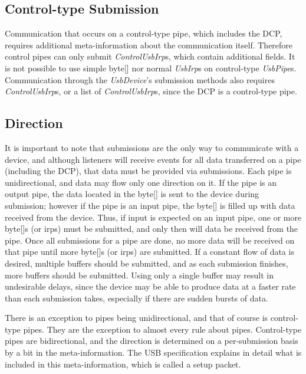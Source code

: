\documentclass{article}
\newcommand{\myinterface}[1]{\emph{#1}}
\begin{document}
\subsection{Control-type Submission}

Communication that occurs on a control-type pipe, which includes the
DCP, requires additional meta-information about the
communication itself.  Therefore control pipes can only submit
\myinterface{ControlUsbIrp}s, which contain additional fields.
It is not possible to use simple byte[] nor normal \myinterface{UsbIrp}s
on control-type \myinterface{UsbPipe}s.  Communication through
the \myinterface{UsbDevice}'s submission methods also requires
\myinterface{ControlUsbIrp}s, or a list of \myinterface{ControlUsbIrp}s,
since the DCP is a control-type pipe.

\subsection{Direction}

It is important to note that submissions are the only way to communicate
with a device, and although listeners will receive events for all data
transferred on a pipe (including the DCP), that data must be provided via
submissions.  Each pipe is unidirectional, and data may flow only one
direction on it.  If the pipe is an output pipe, the data located in the
byte[] is sent to the device during submission; however if the pipe
is an input pipe, the byte[] is filled up with data received from the device.
Thus, if input is expected on an input pipe, one or more byte[]s (or irps)
must be submitted, and only then will data be received from the pipe.
Once all submissions for a pipe are done, no more data will be received on
that pipe until more byte[]s (or irps) are submitted.  If a constant flow
of data is desired, multiple buffers should be submitted, and as each
submission finishes, more buffers should be submitted.  Using only
a single buffer may result in undesirable delays, since the device
may be able to produce data at a faster rate than each submission takes,
especially if there are sudden bursts of data.

There is an exception to pipes being unidirectional, and that of course is
control-type pipes.  They are the exception to almost every rule about pipes.
Control-type pipes are bidirectional, and the direction is determined on
a per-submission basis by a bit in the meta-information.  The USB
specification explains in detail what is included in this meta-information,
which is called a setup packet.
\end{document}
